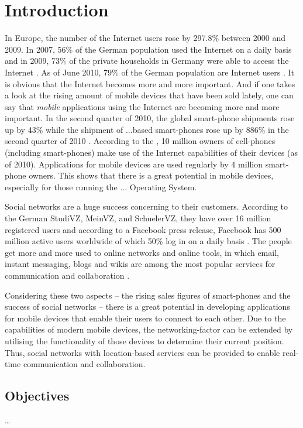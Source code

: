 \chapter{Introduction}
\label{cha:introduction}

In  Europe, the number of the Internet users rose by 297.8\% between 2000 and 2009. In 2007, 56\% of the German population used the Internet on a daily basis \cite{statbundesamt} and in 2009, 73\% of the private households in Germany were able to access the Internet \cite{statba2010}. As of June 2010, 79\% of the German population are Internet users \cite{wius}. It is obvious that the Internet becomes more and more important. And if one takes a look at the rising amount of mobile devices that have been sold lately, one can say that \emph{mobile} applications using the Internet are becoming more and more important. In the second quarter of 2010, the global smart-phone shipments rose up by 43\% \cite{Mawston} while the shipment of ...based smart-phones rose up by 886\% in the second quarter of 2010 \cite{canalysandroid}. According to the \citet{bitkomhandy}, 10 million owners of cell-phones (including smart-phones) make use of the Internet capabilities of their devices (as of 2010). Applications for mobile devices are used regularly by 4 million smart-phone owners. This shows that there is a great potential in mobile devices, especially for those running the ... Operating System.

Social  networks are a huge success concerning to their customers. According to the German StudiVZ, MeinVZ, and SchuelerVZ, they have over 16 million registered users \cite{userstudivz} and according to a Facebook press release, Facebook has 500 million active users worldwide of which 50\% log in on a daily basis \cite{userfacebook}. The people get more and more used to online networks and online tools, in which email, instant messaging, blogs and wikis are among the most popular services for communication and collaboration \citep{danic-introducing}. %

\pagebreak
Considering  these two aspects -- the rising sales figures of smart-phones and the success of social networks -- there is a great potential in developing applications for mobile devices that enable their users to connect to each other. Due to the capabilities of modern mobile devices, the networking-factor can be extended by utilising the functionality of those devices to determine their current position. Thus, social networks with location-based services can be provided to enable real-time communication and collaboration.


\section{Objectives}
\label{sec:introduction__objectives}

\ldots{}